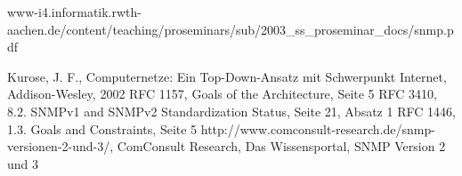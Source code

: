 \documentclass[11pt,a4paper]{article}
\begin{document}
\pagebreak
\begin{thebibliography}{10}
	\begin{small}
		www-i4.informatik.rwth-aachen.de/content/teaching/proseminars/sub/2003\_ss\_proseminar\_docs/snmp.pdf
	\end{small}
		Kurose, J. F.,
		Computernetze: Ein Top-Down-Ansatz mit Schwerpunkt Internet,
		Addison-Wesley,
		2002
		RFC 1157, Goals of the Architecture, Seite 5
		RFC 3410, 8.2.  SNMPv1 and SNMPv2 Standardization Status, Seite 21, Absatz 1
		RFC 1446, 1.3.  Goals and Constraints, Seite 5
		http://www.comconsult-research.de/snmp-versionen-2-und-3/,
		ComConsult Research, Das Wissensportal, SNMP Version 2 und 3
\end{thebibliography}
\end{document}
